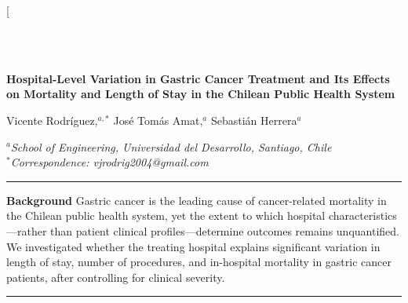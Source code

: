 \documentclass[10pt,twocolumn]{article}
\renewenvironment{abstract}
  {\small\setlength{\parindent}{0pt}\setlength{\parskip}{3pt}%
   \noindent\rule{\linewidth}{1.5pt}\vspace{4pt}\par}
  {\par\vspace{4pt}\noindent\rule{\linewidth}{0.8pt}}
\begin{document}
\twocolumn[{%
\begin{@twocolumnfalse}

\noindent\colorbox{lancetgreen}{%
  \parbox{\dimexpr\linewidth}{\vspace{4pt}
    \hfill\textcolor{white}{\fontsize{7.5}{9}\selectfont
      \textbf{Articles} \quad|\quad
      \textit{Análisis de Datos e Inferencia Estadística — Universidad del Desarrollo, 2026}}
    \hspace{6pt}\vspace{2pt}
  }
}

\vspace{10pt}

{\fontsize{15}{19}\selectfont\bfseries
Hospital-Level Variation in Gastric Cancer Treatment
and Its Effects on Mortality and Length of Stay
in the Chilean Public Health System\par}

\vspace{8pt}

{\fontsize{9}{11}\selectfont
Vicente Rodríguez,$^{a,*}$ José Tomás Amat,$^{a}$ Sebastián Herrera$^{a}$\par}

\vspace{6pt}
{\fontsize{8}{10}\selectfont\itshape
$^{a}$School of Engineering, Universidad del Desarrollo, Santiago, Chile\\[2pt]
$^{*}$Correspondence: vjrodrig2004@gmail.com\par}

\vspace{8pt}

\begin{abstract}
\noindent\textbf{\textcolor{lancetgreen}{Background}}\quad
Gastric cancer is the leading cause of cancer-related mortality in the Chilean public health system,
yet the extent to which hospital characteristics—rather than patient clinical profiles—determine
outcomes remains unquantified. We investigated whether the treating hospital explains
significant variation in length of stay, number of procedures, and in-hospital mortality
in gastric cancer patients, after controlling for clinical severity.


\end{abstract}
\end{@twocolumnfalse}}
\end{document}
